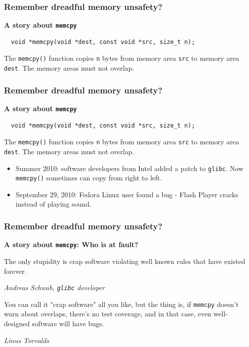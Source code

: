 \documentclass[aspectratio=1610,t]{beamer}
\begin{document}

\begin{frame}[fragile]
\frametitle{Remember dreadful memory unsafety?}
\textbf{A story about \texttt{memcpy}}

\begin{verbatim}
  void *memcpy(void *dest, const void *src, size_t n);
\end{verbatim}

The \texttt{memcpy()} function copies \texttt{n} bytes from memory area \texttt{src} to memory area \texttt{dest}. The memory areas must not overlap.

\end{frame}


\begin{frame}[fragile]
\frametitle{Remember dreadful memory unsafety?}
\textbf{A story about \texttt{memcpy}}

\begin{verbatim}
  void *memcpy(void *dest, const void *src, size_t n);
\end{verbatim}

The \texttt{memcpy()} function copies \texttt{n} bytes from memory area \texttt{src} to memory area \texttt{dest}. The memory areas must not overlap.

\begin{itemize}
    \item Summer 2010: software developers from Intel added a patch to \texttt{glibc}. Now \texttt{memcpy()} sometimes can copy from right to left.
    \item September 29, 2010: Fedora Linux user found a bug - Flash Player cracks instead of playing sound.
\end{itemize}

\end{frame}


\begin{frame}[fragile]
\frametitle{Remember dreadful memory unsafety?}
\textbf{A story about \texttt{memcpy}: Who is at fault?}

The only stupidity is crap software violating well known rules that have existed forever.
\begin{flushright}
    \textit{Andreas Schwab, \texttt{glibc} developer}
\end{flushright}

You can call it "crap software" all you like, but the thing is, if \texttt{memcpy} doesn't warn about overlaps, there's no test coverage, and in that case, even well-designed software will have bugs.
\begin{flushright}
    \textit{Linus Torvalds}
\end{flushright}

\end{frame}
\end{document}
